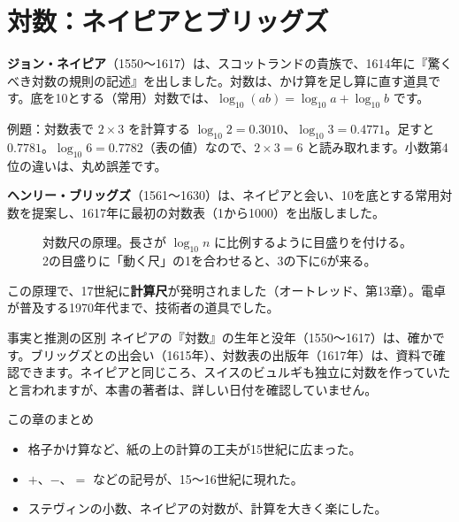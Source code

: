 \documentclass[a4paper,11pt,openany]{ltjsbook}
\begin{document}
\section{対数：ネイピアとブリッグズ}

\textbf{ジョン・ネイピア}（1550〜1617）は、スコットランドの貴族で、1614年に『驚くべき対数の規則の記述』を出しました。対数は、かけ算を足し算に直す道具です。底を10とする（常用）対数では、$\log_{10}(ab)=\log_{10}a+\log_{10}b$ です。

\begin{examplebox}{例題：対数表で $2\times3$ を計算する}
$\log_{10}2=0.3010$、$\log_{10}3=0.4771$。足すと $0.7781$。$\log_{10}6=0.7782$（表の値）なので、$2\times3=6$ と読み取れます。小数第4位の違いは、丸め誤差です。
\end{examplebox}

\textbf{ヘンリー・ブリッグズ}（1561〜1630）は、ネイピアと会い、10を底とする常用対数を提案し、1617年に最初の対数表（1から1000）を出版しました。

\begin{figure}[htbp]
\centering
{}
\caption{対数尺の原理。長さが $\log_{10}n$ に比例するように目盛りを付ける。2の目盛りに「動く尺」の1を合わせると、3の下に6が来る。}
\end{figure}

この原理で、17世紀に\textbf{計算尺}が発明されました（オートレッド、第13章）。電卓が普及する1970年代まで、技術者の道具でした。

\begin{notebox}{事実と推測の区別}
ネイピアの『対数』の生年と没年（1550〜1617）は、確かです。ブリッグズとの出会い（1615年）、対数表の出版年（1617年）は、資料で確認できます。ネイピアと同じころ、スイスのビュルギも独立に対数を作っていたと言われますが、本書の著者は、詳しい日付を確認していません。
\end{notebox}

\begin{pointbox}{この章のまとめ}
\begin{itemize}[leftmargin=*]
\item 格子かけ算など、紙の上の計算の工夫が15世紀に広まった。
\item $+$、$-$、$=$ などの記号が、15〜16世紀に現れた。
\item ステヴィンの小数、ネイピアの対数が、計算を大きく楽にした。
\end{itemize}
\end{pointbox}
\end{document}
